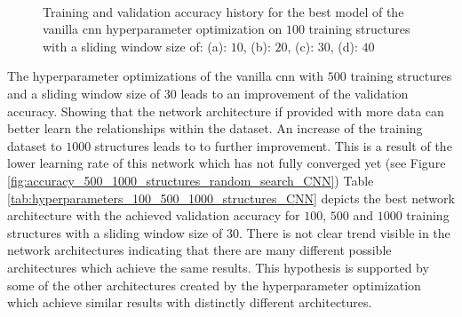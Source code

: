 \documentclass[conference]{IEEEtran}
\begin{document}
\begin{figure}[htp]
	\centering
	\quad
	\\
	\quad
	\caption{Training and validation accuracy history for the best model of the vanilla \gls{cnn} hyperparameter optimization on $ 100 $ training structures with a sliding window size of: (a): $ 10 $, (b): $ 20 $, (c): $ 30 $, (d): $ 40 $}
	\label{fig:accuracy_100_structures_random_search_cnn}
\end{figure}

The hyperparameter optimizations of the vanilla \gls{cnn} with $ 500 $ training structures and a sliding window size of $ 30 $ leads to an improvement of the validation accuracy. Showing that the network architecture if provided with more data can better learn the relationships within the dataset. An increase of the training dataset to $ 1000 $ structures leads to to further improvement. This is a result of the lower learning rate of this network which has not fully converged yet (see Figure \ref{fig:accuracy_500_1000_structures_random_search_CNN})  Table \ref{tab:hyperparameters_100_500_1000_structures_CNN} depicts the best network architecture with the achieved validation accuracy for $ 100 $, $ 500 $ and $ 1000 $ training structures with a sliding window size of $ 30 $. There is not clear trend visible in the network architectures indicating that there are many different possible architectures which achieve the same results. This hypothesis is supported by some of the other architectures created by the hyperparameter optimization which achieve similar results with distinctly different architectures.
\end{document}
